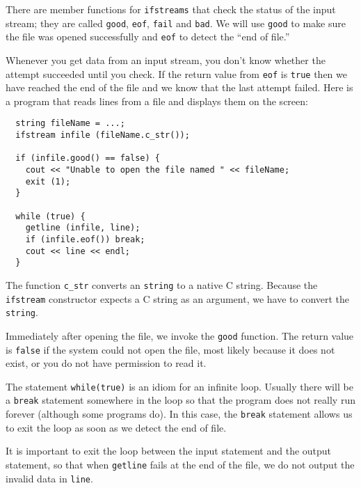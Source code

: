 There are member functions for {\tt ifstreams} that check the status
of the input stream; they are called {\tt good}, {\tt eof}, {\tt fail}
and {\tt bad}.  We will use {\tt good} to make sure the file was
opened successfully and {\tt eof} to detect the ``end of file.''


Whenever you get data from an input stream, you don't
know whether the attempt succeeded until you check.  If the
return value from {\tt eof} is {\tt true} then we have reached
the end of the file and we know that the last attempt failed.
Here is a program that reads lines from a file and displays
them on the screen:

\begin{verbatim}
  string fileName = ...;
  ifstream infile (fileName.c_str());

  if (infile.good() == false) {
    cout << "Unable to open the file named " << fileName;
    exit (1);
  }

  while (true) {
    getline (infile, line);
    if (infile.eof()) break;
    cout << line << endl;
  }
\end{verbatim}
%
The function {\tt c\_str} converts an {\tt string} to a
native C string.  Because the {\tt ifstream} constructor
expects a C string as an argument, we have to convert
the {\tt string}.


Immediately after opening the file, we invoke the {\tt good} function.
The return value is {\tt false} if the system could not open the file,
most likely because it does not exist, or you do not have permission
to read it.


The statement {\tt while(true)} is an idiom for an infinite
loop.  Usually there will be a {\tt break} statement somewhere in
the loop so that the program does not really run forever (although
some programs do).  In this case, the {\tt break} statement allows
us to exit the loop as soon as we detect the end of file.


It is important to exit the loop between the input statement and
the output statement, so that when {\tt getline} fails at the
end of the file, we do not output the invalid data in {\tt line}.

